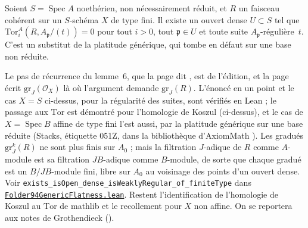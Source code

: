 \begin{encadre}
\begin{theoreme*}\nonverifie
Soient $S = \operatorname{Spec} A$ noethérien, non nécessairement réduit, et $R$ un faisceau cohérent sur un $S$-schéma $X$ de type fini. Il existe un ouvert dense $U \subset S$ tel que $\mathrm{Tor}_i^A(R, A_{\mathfrak p}/(t)) = 0$ pour tout $i > 0$, tout $\mathfrak p \in U$ et toute suite $A_{\mathfrak p}$-régulière~$t$. C'est un substitut de la platitude générique, qui tombe en défaut sur une base non réduite.
\end{theoreme*}
\end{encadre}
{\small Le pas de récurrence du lemme~6, que la page dit , est de l'édition, et la page écrit $\mathrm{gr}_J(\mathcal O_X)$ là où l'argument demande $\mathrm{gr}_J(R)$. L'énoncé en un point et le cas $X = S$ ci-dessus, pour la régularité des suites, sont vérifiés en Lean ; le passage aux $\mathrm{Tor}$ est démontré pour l'homologie de Koszul (ci-dessus), et le cas de $X = \operatorname{Spec} B$ affine de type fini l'est aussi, par la platitude générique sur une base réduite (Stacks, étiquette 051Z, dans la bibliothèque d'AxiomMath \cite{axiomstacks}). Les gradués $\mathrm{gr}^k_J(R)$ ne sont plus finis sur $A_0$ ; mais la filtration $J$-adique de $R$ comme $A$-module est sa filtration $JB$-adique comme $B$-module, de sorte que chaque gradué est un $B/JB$-module fini, libre sur $A_0$ au voisinage des points d'un ouvert dense. Voir \texttt{exists\_isOpen\_dense\_isWeaklyRegular\_of\_finiteType} dans \href{\leanblobmain/RingTheory/Folder94GenericFlatness.lean}{\texttt{Folder94GenericFlatness.\allowbreak{}lean}}. Restent l'identification de l'homologie de Koszul au $\mathrm{Tor}$ de mathlib et le recollement pour $X$ non affine. On se reportera aux notes de Grothendieck ().\par}

